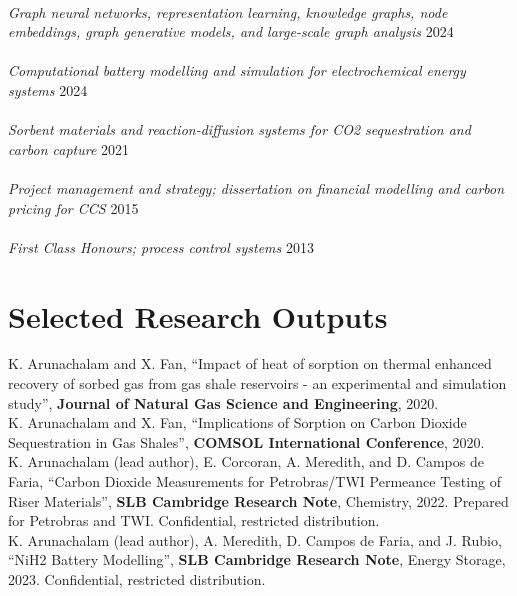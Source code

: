 \documentclass{../../templates/karthicv-single}
\begin{document}
\\
\textit{Graph neural networks, representation learning, knowledge graphs, node embeddings, graph generative models, and large-scale graph analysis} \hfill 2024\\
\\
\textit{Computational battery modelling and simulation for electrochemical energy systems} \hfill 2024\\
\\
\textit{Sorbent materials and reaction-diffusion systems for CO2 sequestration and carbon capture} \hfill 2021\\
\\
\textit{Project management and strategy; dissertation on financial modelling and carbon pricing for CCS} \hfill 2015\\
\\
\textit{First Class Honours; process control systems} \hfill 2013\\

\section{Selected Research Outputs}

K. Arunachalam and X. Fan, ``Impact of heat of sorption on thermal enhanced recovery of sorbed gas from gas shale reservoirs - an experimental and simulation study'', \textbf{Journal of Natural Gas Science and Engineering}, 2020.\\
K. Arunachalam and X. Fan, ``Implications of Sorption on Carbon Dioxide Sequestration in Gas Shales'', \textbf{COMSOL International Conference}, 2020.\\
K. Arunachalam (lead author), E. Corcoran, A. Meredith, and D. Campos de Faria, ``Carbon Dioxide Measurements for Petrobras/TWI Permeance Testing of Riser Materials'', \textbf{SLB Cambridge Research Note}, Chemistry, 2022. Prepared for Petrobras and TWI. Confidential, restricted distribution.\\
K. Arunachalam (lead author), A. Meredith, D. Campos de Faria, and J. Rubio, ``NiH2 Battery Modelling'', \textbf{SLB Cambridge Research Note}, Energy Storage, 2023. Confidential, restricted distribution.
\end{document}
